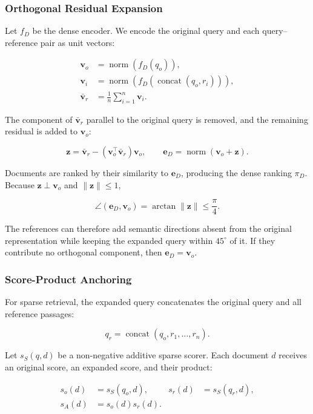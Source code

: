 \subsubsection{Orthogonal Residual Expansion}

Let $f_D$ be the dense encoder. We encode the original query and each
query--reference pair as unit vectors:

\[
\begin{aligned}
\mathbf v_o&=\operatorname{norm}(f_D(q_o)),\\
\mathbf v_i&=\operatorname{norm}
\!\left(f_D(\operatorname{concat}(q_o,r_i))\right),\\
\bar{\mathbf v}_r&=\frac{1}{n}\sum_{i=1}^{n}\mathbf v_i .
\end{aligned}
\]

The component of $\bar{\mathbf v}_r$ parallel to the original query is
removed, and the remaining residual is added to $\mathbf v_o$:

\[
\mathbf z=
\bar{\mathbf v}_r-
(\mathbf v_o^\top\bar{\mathbf v}_r)\mathbf v_o,
\qquad
\mathbf e_D=\operatorname{norm}(\mathbf v_o+\mathbf z).
\]

Documents are ranked by their similarity to $\mathbf e_D$, producing the
dense ranking $\pi_D$. Because $\mathbf z\perp\mathbf v_o$ and
$\|\mathbf z\|\leq1$,

\[
\angle(\mathbf e_D,\mathbf v_o)
=\arctan\|\mathbf z\|
\leq\frac{\pi}{4}.
\]

The references can therefore add semantic directions absent from the original
representation while keeping the expanded query within $45^\circ$ of it. If
they contribute no orthogonal component, then $\mathbf e_D=\mathbf v_o$.

\subsubsection{Score-Product Anchoring}

For sparse retrieval, the expanded query concatenates the original query and
all reference passages:

\[
q_r=\operatorname{concat}(q_o,r_1,\ldots,r_n).
\]

Let $s_S(q,d)$ be a non-negative additive sparse scorer. Each document $d$
receives an original score, an expanded score, and their product:

\[
\begin{aligned}
s_o(d)&=s_S(q_o,d), &
s_r(d)&=s_S(q_r,d),\\
s_A(d)&=s_o(d)s_r(d).&&
\end{aligned}
\]

